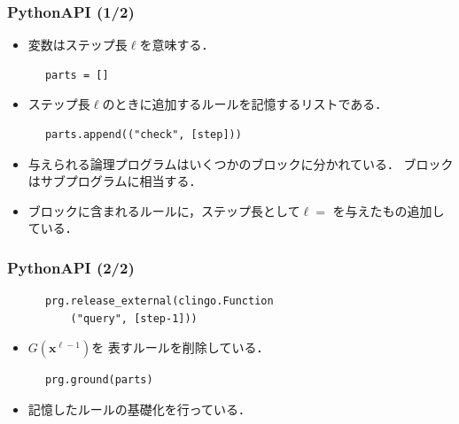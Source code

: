 \documentclass[dvipdfmx,11pt]{beamer}
\begin{document}
\begin{frame}[fragile]\frametitle{PythonAPI (1/2)}

  \begin{itemize}
    \item 変数はステップ長$\ell$を意味する．
  \end{itemize}

  \begin{exampleblock}{}
    \begin{lstlisting}
      parts = []
    \end{lstlisting}
  \end{exampleblock}
  \begin{itemize}
    \item ステップ長$\ell$のときに追加するルールを記憶するリストである．
  \end{itemize}

  \begin{exampleblock}{}
    \begin{lstlisting}
      parts.append(("check", [step]))
    \end{lstlisting}
  \end{exampleblock}
  \begin{itemize}
    \item 与えられる論理プログラムはいくつかのブロックに分かれている．
          ブロックはサブプログラムに相当する．
    \item {}ブロックに含まれるルールに，ステップ長として$\ell=$
          を与えたもの追加している．
  \end{itemize}

\end{frame}

\begin{frame}[fragile]\frametitle{PythonAPI (2/2)}

  \begin{exampleblock}{}
    \begin{lstlisting}
      prg.release_external(clingo.Function
          ("query", [step-1]))
    \end{lstlisting}
  \end{exampleblock}
  \begin{itemize}
    \item $G(\bm{x}^{\ell -1})$を
          表すルールを削除している．
  \end{itemize}

  \begin{exampleblock}{}
    \begin{lstlisting}
      prg.ground(parts)
    \end{lstlisting}
  \end{exampleblock}
  \begin{itemize}
    \item 記憶したルールの基礎化を行っている．
  \end{itemize}
  
\end{frame}
\end{document}
